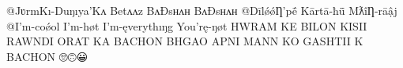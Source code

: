 @JʋrmKı-Duŋıya'Kʌ Betʌʌz BʌÐsʜʌʜ BʌÐsʜʌʜ 
@DīlǿǿȠ'pḗ Kārtā-ħǖ MƛîȠ-rāậj 
@I'm-coǿol I'm-høt I'm-ęverythıŋg You'rę-ŋøt 
HWRAM KE BILON KISII RAWNDI ORAT KA BACHON BHGAO APNI MANN KO GASHTII K BACHON 🙄🙃😀
